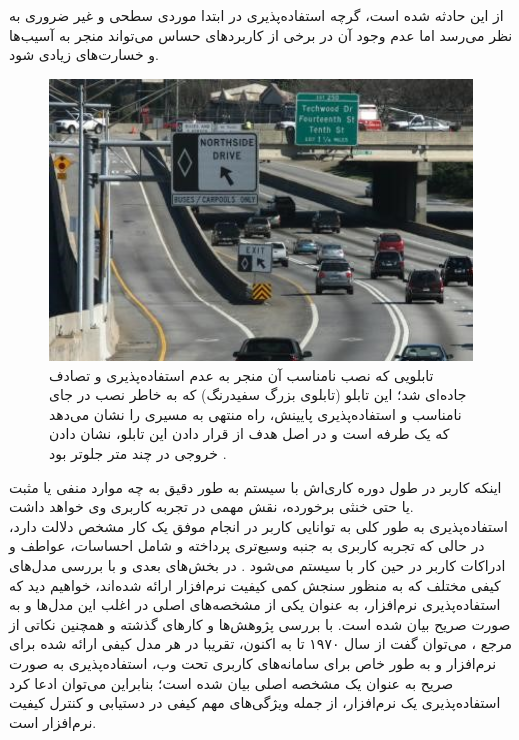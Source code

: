 \cite{albert_measuring_2013}
از این حادثه شده است، گرچه استفاده‌پذیری در ابتدا موردی سطحی و غیر ضروری به نظر می‌رسد اما عدم وجود آن در برخی از کاربردهای حساس می‌تواند منجر به آسیب‌ها و خسارت‌های زیادی شود.
\begin{figure}[H]
	\centering\includegraphics[width=14.8cm]{Resources/tabloo.JPG}
	\caption[تابلویی که نصب نامناسب آن منجر به عدم استفاده‌پذیری و تصادف جاده‌ای شد]
	{تابلویی که نصب نامناسب آن منجر به عدم استفاده‌پذیری و تصادف جاده‌ای شد؛ این تابلو (تابلوی بزرگ سفیدرنگ) که به خاطر نصب در جای نامناسب و استفاده‌پذیری پایینش، راه منتهی به مسیری را نشان می‌دهد که یک طرفه است و در اصل هدف از قرار دادن این تابلو، نشان دادن خروجی در چند متر جلوتر بود
		\cite{noauthor_bluffton_2018}.
	}
	\label{fig:bluffton}
\end{figure}
 اینکه کاربر در طول دوره کاری‌اش با سیستم به طور دقیق به چه موارد منفی یا مثبت یا حتی خنثی برخورده، نقش مهمی در تجربه کاربری وی خواهد داشت.\\
 استفاده‌پذیری به طور کلی به توانایی کاربر در انجام موفق یک کار مشخص دلالت دارد، در حالی که تجربه کاربری به جنبه وسیع‌تری پرداخته و شامل احساسات، عواطف و ادراکات کاربر در حین کار با سیستم می‌شود
 \cite{albert_measuring_2013}.
 در بخش‌های بعدی و با بررسی مدل‌های کیفی مختلف که به منظور سنجش کمی کیفیت نرم‌افزار ارائه شده‌اند، خواهیم دید که استفاده‌پذیری نرم‌افزار، به عنوان یکی از مشخصه‌های اصلی در اغلب این مدل‌ها و به صورت صریح  بیان شده است. با بررسی پژوهش‌ها و کارهای گذشته و همچنین نکاتی از مرجع
 \cite{pressman_software_2015}،
 می‌توان گفت از سال ۱۹۷۰ تا به اکنون، تقریبا در هر مدل کیفی ارائه شده برای نرم‌افزار و به طور خاص برای سامانه‌های کاربری تحت وب، استفاده‌پذیری به صورت صریح به عنوان یک مشخصه اصلی بیان شده است؛ بنابراین می‌توان ادعا کرد استفاده‌پذیری یک نرم‌افزار، از جمله ویژگی‌های مهم کیفی در دستیابی و کنترل کیفیت نرم‌افزار است.
